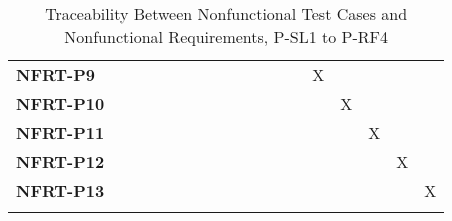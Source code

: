 \documentclass[12pt, titlepage]{article}
\begin{document}
\begin{landscape}
\begin{longtable}{|l|ccccccccccccc|}
  \textbf{NFRT-P9}  & ~              & ~              & ~              & ~              & ~              & ~              & ~              & ~              & X              & ~              & ~              & ~              & ~              \\
  \textbf{NFRT-P10} & ~              & ~              & ~              & ~              & ~              & ~              & ~              & ~              & ~              & X              & ~              & ~              & ~              \\
  \textbf{NFRT-P11} & ~              & ~              & ~              & ~              & ~              & ~              & ~              & ~              & ~              & ~              & X              & ~              & ~              \\
  \textbf{NFRT-P12} & ~              & ~              & ~              & ~              & ~              & ~              & ~              & ~              & ~              & ~              & ~              & X              & ~              \\
  \textbf{NFRT-P13} & ~              & ~              & ~              & ~              & ~              & ~              & ~              & ~              & ~              & ~              & ~              & ~              & X              \\
  \hline
\caption{Traceability Between Nonfunctional Test Cases and Nonfunctional Requirements, P-SL1 to P-RF4} \\
\end{longtable}

\newpage


\end{landscape}
\end{document}
